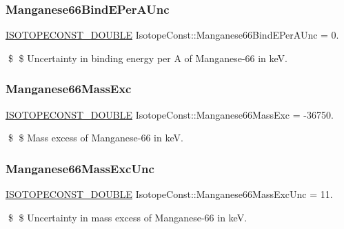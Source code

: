 \subsubsection{\texorpdfstring{Manganese66\+Bind\+E\+Per\+A\+Unc}{Manganese66BindEPerAUnc}}
{\footnotesize\ttfamily \mbox{\hyperlink{group___isotope_const-_macros_ga8f45a7272ce02c0b4c65c44636ed719a}{I\+S\+O\+T\+O\+P\+E\+C\+O\+N\+S\+T\+\_\+\+D\+O\+U\+B\+LE}} Isotope\+Const\+::\+Manganese66\+Bind\+E\+Per\+A\+Unc = 0.}

\$ \$ Uncertainty in binding energy per A of Manganese-\/66 in keV. \mbox{\label{group___isotope_const-_manganese-_mn66_gabe41d69acda493d83656754811eb9b35}} 
\subsubsection{\texorpdfstring{Manganese66\+Mass\+Exc}{Manganese66MassExc}}
{\footnotesize\ttfamily \mbox{\hyperlink{group___isotope_const-_macros_ga8f45a7272ce02c0b4c65c44636ed719a}{I\+S\+O\+T\+O\+P\+E\+C\+O\+N\+S\+T\+\_\+\+D\+O\+U\+B\+LE}} Isotope\+Const\+::\+Manganese66\+Mass\+Exc = -\/36750.}

\$ \$ Mass excess of Manganese-\/66 in keV. \mbox{\label{group___isotope_const-_manganese-_mn66_ga94078427c8d0b17620f0ad4d88aa06e1}} 
\subsubsection{\texorpdfstring{Manganese66\+Mass\+Exc\+Unc}{Manganese66MassExcUnc}}
{\footnotesize\ttfamily \mbox{\hyperlink{group___isotope_const-_macros_ga8f45a7272ce02c0b4c65c44636ed719a}{I\+S\+O\+T\+O\+P\+E\+C\+O\+N\+S\+T\+\_\+\+D\+O\+U\+B\+LE}} Isotope\+Const\+::\+Manganese66\+Mass\+Exc\+Unc = 11.}

\$ \$ Uncertainty in mass excess of Manganese-\/66 in keV. \mbox{\label{group___isotope_const-_manganese-_mn66_gaa457d1e2614e8c34765675ae93084ec8}} 

